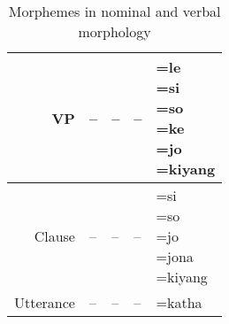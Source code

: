 \begin{table}
\begin{tabular}{r|llll}
						\hline
VP & -- & -- & -- & \parbox{2cm}{\vspace{.2cm}=le\\=si\\=so\\=ke\\=jo\\=kiyang\vspace{.2cm}}\\
						\hline
Clause & --  & --  & --  &  \parbox{2cm}{\vspace{.2cm}=si\\=so\\=jo\\=jona\\=kiyang\vspace{.2cm}}\\
						\hline
Utterance & --  & --  &  -- & =katha \vspace{.2cm}\\
						\hline
						\hline
		\end{tabular}
	\caption{Morphemes in nominal and verbal morphology}
	\label{tab:MorphemesInNominalAndVerbalMorphology}
\end{table}

 